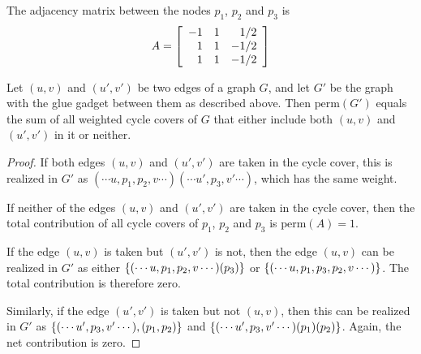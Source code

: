 \begin{center}
\end{center}
The adjacency matrix between the nodes $p_1$, $p_2$ and $p_3$ is 
\[
A = \left[\begin{array}{rrr}
-1 & 1 & 1/2\\
1 & 1 & -1/2\\
1 & 1 & -1/2
\end{array}\right]
\]

\noindent
\begin{claim}
Let $(u,v)$ and $(u',v')$ be two edges of a graph $G$, and let $G'$ be the graph with the glue gadget between them as described above. 
Then $\mathrm{perm}(G')$ equals the sum of all weighted cycle covers of $G$ that either include both $(u,v)$ and $(u',v')$ in it or neither. 
\end{claim}
\begin{proof}
If both edges $(u,v)$ and $(u',v')$ are taken in the cycle cover, this is realized in $G'$ as ${(\cdots u,p_1, p_2, v \cdots) (\cdots u', p_3, v' \cdots)}$, which has the same weight.  

If neither of the edges $(u,v)$ and $(u',v')$ are taken in the cycle cover, then the total contribution of all cycle covers of $p_1$, $p_2$ and $p_3$ is $\mathrm{perm}(A) = 1$. 

If the edge $(u,v)$ is taken but $(u',v')$ is not, then the edge $(u,v)$ can be realized in $G'$ as either $\left\{(\cdots u,p_1,p_2,v \cdots) (p_3)\right\}$ or $\left\{(\cdots u,p_1,p_3,p_2,v \cdots )\right\}$. 
The total contribution is therefore zero. 

Similarly, if the edge $(u',v')$ is taken but not $(u,v)$, then this can be realized in $G'$ as $\left\{(\cdots u',p_3,v' \cdots),(p_1,p_2)\right\}$ and $\left\{(\cdots u',p_3, v' \cdots) (p_1) (p_2)\right\}$. 
Again, the net contribution is zero.  
\end{proof}

